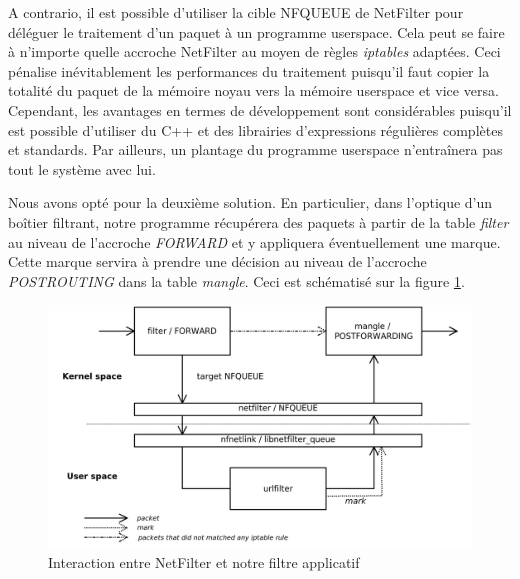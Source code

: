 A contrario, il est possible d'utiliser la cible NFQUEUE de NetFilter
pour déléguer le traitement d'un paquet à un programme userspace. Cela
peut se faire à n'importe quelle accroche NetFilter au moyen de règles
\textit{iptables} adaptées. Ceci pénalise inévitablement les
performances du traitement puisqu'il faut copier la totalité du paquet
de la mémoire noyau vers la mémoire userspace et vice
versa. Cependant, les avantages en termes de développement sont
considérables puisqu'il est possible d'utiliser du C++ et des
librairies d'expressions régulières complètes et standards. Par
ailleurs, un plantage du programme userspace n'entraînera pas tout le
système avec lui.

Nous avons opté pour la deuxième solution. En particulier, dans
l'optique d'un boîtier filtrant, notre programme récupérera des
paquets à partir de la table \textit{filter} au niveau de l'accroche
\textit{FORWARD} et y appliquera éventuellement une marque. Cette
marque servira à prendre une décision au niveau de l'accroche
\textit{POSTROUTING} dans la table \textit{mangle}. Ceci est
schématisé sur la figure \ref{schema1}.

\begin{figure}[h]
  \begin{center}
    \includegraphics[scale=0.2]{schema1.png}
    \caption{Interaction entre NetFilter et notre filtre applicatif}
    \label{schema1}
  \end{center}
\end{figure}
